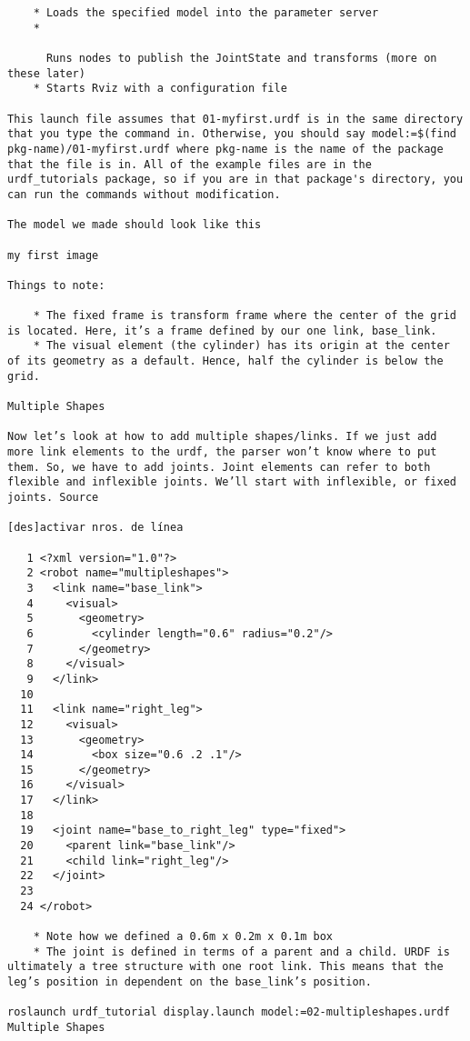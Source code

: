 \begin{verbatim}
    * Loads the specified model into the parameter server
    *

      Runs nodes to publish the JointState and transforms (more on these later)
    * Starts Rviz with a configuration file 

This launch file assumes that 01-myfirst.urdf is in the same directory that you type the command in. Otherwise, you should say model:=$(find pkg-name)/01-myfirst.urdf where pkg-name is the name of the package that the file is in. All of the example files are in the urdf_tutorials package, so if you are in that package's directory, you can run the commands without modification.

The model we made should look like this

my first image

Things to note:

    * The fixed frame is transform frame where the center of the grid is located. Here, it’s a frame defined by our one link, base_link.
    * The visual element (the cylinder) has its origin at the center of its geometry as a default. Hence, half the cylinder is below the grid. 

Multiple Shapes

Now let’s look at how to add multiple shapes/links. If we just add more link elements to the urdf, the parser won’t know where to put them. So, we have to add joints. Joint elements can refer to both flexible and inflexible joints. We’ll start with inflexible, or fixed joints. Source

[des]activar nros. de línea

   1 <?xml version="1.0"?>
   2 <robot name="multipleshapes">
   3   <link name="base_link">
   4     <visual>
   5       <geometry>
   6         <cylinder length="0.6" radius="0.2"/>
   7       </geometry>
   8     </visual>
   9   </link>
  10 
  11   <link name="right_leg">
  12     <visual>
  13       <geometry>
  14         <box size="0.6 .2 .1"/>
  15       </geometry>
  16     </visual>
  17   </link>
  18 
  19   <joint name="base_to_right_leg" type="fixed">
  20     <parent link="base_link"/>
  21     <child link="right_leg"/>
  22   </joint>
  23 
  24 </robot>

    * Note how we defined a 0.6m x 0.2m x 0.1m box
    * The joint is defined in terms of a parent and a child. URDF is ultimately a tree structure with one root link. This means that the leg’s position in dependent on the base_link’s position. 

roslaunch urdf_tutorial display.launch model:=02-multipleshapes.urdf Multiple Shapes


\end{verbatim}
